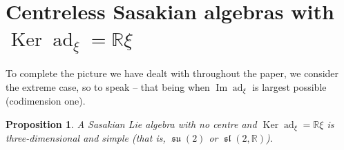 \documentclass[12pt, twoside]{amsart}
\def\R{\mathbb{R}}
\def\ad{\operatorname{ad}}
\renewcommand{\Im}{\operatorname{Im}}
\def\Ker{\operatorname{Ker}}
\newcommand{\lie}[1]{\mathfrak{#1}}
\DeclareMathOperator{\slie}{\lie{sl}}
\DeclareMathOperator{\su}{\lie{su}}
\newtheorem{prop}[definition]{Proposition}
\theoremstyle{definition}
\begin{document}

\section[Centreless Sasakian algebras with $ \Ker \ad_{\xi}=\R \xi $]{Centreless Sasakian algebras with \texorpdfstring{$ \Ker \ad_{\xi}=\R \xi $}{}}

To complete the picture we have dealt with throughout the paper, we consider the extreme case, so to speak -- that being when $\Im  \ad_{\xi}$  is  largest possible (codimension one). 

\begin{prop}\label{prop: final}
A Sasakian Lie algebra with no centre and $\Ker \ad _{\xi}= \R\xi$ is three-dimensional and simple (that is, $\su(2)$ or  $\slie(2, \R)$).
\end{prop}
\end{document}
